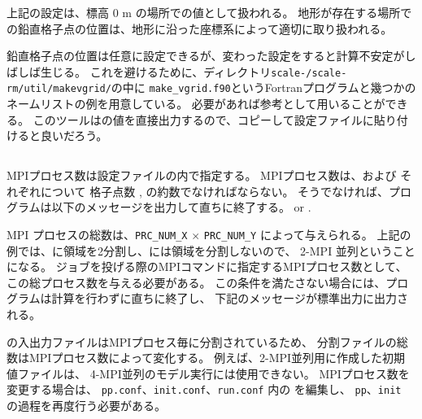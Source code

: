 上記の設定は、標高 0 m の場所での値として扱われる。
地形が存在する場所での鉛直格子点の位置は、地形に沿った座標系によって適切に取り扱われる。


鉛直格子点の位置は任意に設定できるが、変わった設定をすると計算不安定がしばしば生じる。
これを避けるために、ディレクトリ\texttt{scale-\version/scale-rm/util/makevgrid/}の中に
\verb|make_vgrid.f90|というFortranプログラムと幾つかのネームリストの例を用意している。
必要があれば参考として用いることができる。
このツールはの値を直接出力するので、コピーして設定ファイルに貼り付けると良いだろう。

\subsection{\SubsecMPIProcess} \label{subsec:relation_dom_reso2}

MPIプロセス数は設定ファイルの内で指定する。
MPIプロセス数は、\XDIR および \YDIR それぞれについて 格子点数 ,  の約数でなければならない。
そうでなければ、プログラムは以下のメッセージを出力して直ちに終了する。
or
.

MPI プロセスの総数は、\verb|PRC_NUM_X| $\times$ \verb|PRC_NUM_Y|  によって与えられる。
上記の例では、\XDIR に領域を2分割し、\YDIR には領域を分割しないので、
2-MPI 並列ということになる。
ジョブを投げる際のMPIコマンドに指定するMPIプロセス数として、この総プロセス数を与える必要がある。
この条件を満たさない場合には、プログラムは計算を行わずに直ちに終了し、
下記のメッセージが標準出力に出力される。

\scalerm の入出力ファイルはMPIプロセス毎に分割されているため、
分割ファイルの総数はMPIプロセス数によって変化する。
例えば、2-MPI並列用に作成した初期値ファイルは、
4-MPI並列のモデル実行には使用できない。
MPIプロセス数を変更する場合は、
\verb|pp.conf|、\verb|init.conf|、\verb|run.conf| 内の
を編集し、
\verb|pp|、\verb|init| の過程を再度行う必要がある。

